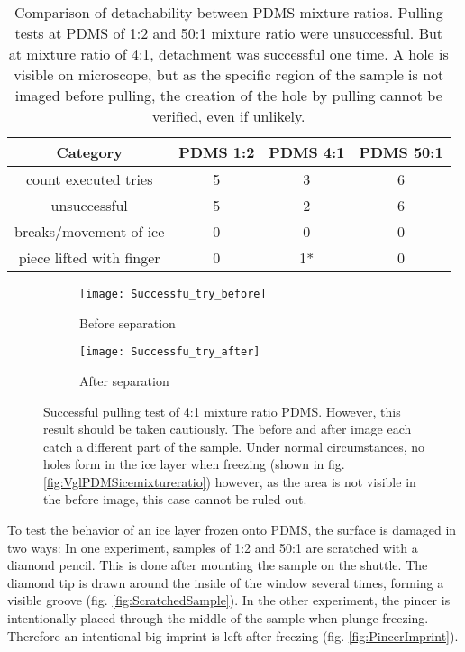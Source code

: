 
\begin{table}
	\centering
	\begin{tabular}{|c|c|c|c|}
		\hline
		Category & PDMS 1:2 & PDMS 4:1 & PDMS 50:1 \\
		\hline
		\hline
		count executed tries & 5 & 3 & 6\\
		\hline
		unsuccessful & 5 & 2 & 6\\
		\hline
		breaks/movement of ice & 0 & 0 & 0\\
		\hline
		piece lifted with finger & 0 & 1* & 0\\
		\hline		
	\end{tabular}
	\caption{Comparison of detachability between PDMS mixture ratios. Pulling tests at PDMS of 1:2 and 50:1 mixture ratio were unsuccessful. But at mixture ratio of 4:1, detachment was successful one time. A hole is visible on microscope, but as the specific region of the sample is not imaged before pulling, the creation of the hole by pulling cannot be verified, even if unlikely.}
	\label{table:AttemptsPDMS}
\end{table}

\begin{figure}[hbt!]
	\centering
	\begin{subfigure}[]{0.45\textwidth}
		\centering
		\texttt{[image: Successfu\_try\_before]}
		\caption{Before separation}
	\end{subfigure}
	\begin{subfigure}[]{0.45\textwidth}
		\centering
		\texttt{[image: Successfu\_try\_after]}
		\caption{After separation}
	\end{subfigure}
	\caption{Successful pulling test of 4:1 mixture ratio PDMS. However, this result should be taken cautiously. The before and after image each catch a different part of the sample. Under normal circumstances, no holes form in the ice layer when freezing (shown in fig. \ref{fig:VglPDMSicemixtureratio}) however, as the area is not visible in the before image, this case cannot be ruled out.}
	\label{fig:SuccessfulDetachment}
\end{figure}

To test the behavior of an ice layer frozen onto PDMS, the surface is damaged in two ways: In one experiment, samples of 1:2 and 50:1 are scratched with a diamond pencil. This is done after mounting the sample on the shuttle. The diamond tip is drawn around the inside of the window several times, forming a visible groove (fig. \ref{fig:ScratchedSample}). In the other experiment, the pincer is intentionally placed through the middle of the sample when plunge-freezing. Therefore an intentional big imprint is left after freezing (fig. \ref{fig:PincerImprint}).

